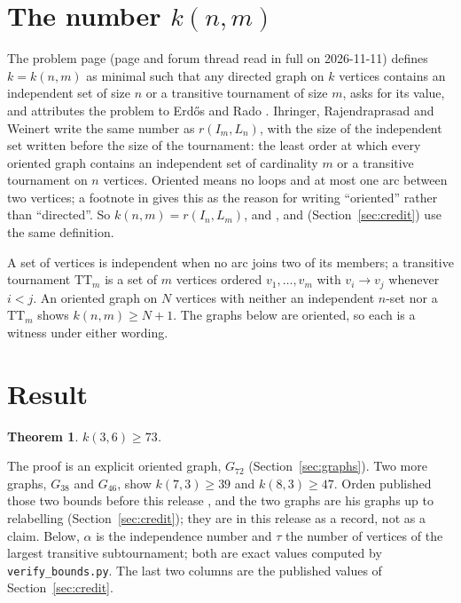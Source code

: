 \documentclass[11pt]{amsart}
\newcommand{\TT}[1]{\mathrm{TT}_{#1}}
\theoremstyle{plain}
\newtheorem{theorem}{Theorem}[section]
\theoremstyle{definition}
\theoremstyle{remark}
\begin{document}
\section{The number \texorpdfstring{$k(n,m)$}{k(n,m)}}\label{sec:def}

The problem page \cite{Blo} (page and forum thread read in full on 2026-11-11) defines
$k=k(n,m)$ as minimal such that any directed graph on $k$ vertices contains an independent set of
size $n$ or a transitive tournament of size $m$, asks for its value, and attributes the problem to
Erd\H{o}s and Rado \cite{ErRa67}. Ihringer, Rajendraprasad and Weinert \cite{IRW21} write the same
number as $r(I_m,L_n)$, with the size of the independent set written before the size of the
tournament: the least order at which every oriented graph contains an independent set of
cardinality $m$ or a transitive tournament on $n$ vertices. Oriented means no loops and at most one
arc between two vertices; a footnote in \cite{IRW21} gives this as the reason for writing
``oriented'' rather than ``directed''. So $k(n,m)=r(I_n,L_m)$, and \cite{Orden}, \cite{Orden2} and
\cite{rsv} (Section~\ref{sec:credit}) use the same definition.

A set of vertices is independent when no arc joins two of its members; a transitive tournament
$\TT{m}$ is a set of $m$ vertices ordered $v_1,\dots,v_m$ with $v_i\to v_j$ whenever $i<j$. An
oriented graph on $N$ vertices with neither an independent $n$-set nor a $\TT{m}$ shows
$k(n,m)\geq N+1$. The graphs below are oriented, so each is a witness under either wording.

\section{Result}\label{sec:result}

\begin{theorem}\label{thm:main}
$k(3,6)\geq 73$.
\end{theorem}

The proof is an explicit oriented graph, $G_{72}$ (Section~\ref{sec:graphs}). Two more graphs,
$G_{38}$ and $G_{46}$, show $k(7,3)\geq 39$ and $k(8,3)\geq 47$. Orden published those two bounds
before this release \cite{Orden2}, and the two graphs are his graphs up to relabelling
(Section~\ref{sec:credit}); they are in this release as a record, not as a claim. Below, $\alpha$
is the independence number and $\tau$ the number of vertices of the largest transitive
subtournament; both are exact values computed by \texttt{verify\_bounds.py}. The last two columns
are the published values of Section~\ref{sec:credit}.
\end{document}
